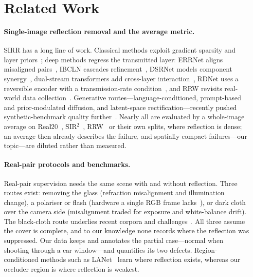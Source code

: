 \section{Related Work}
\label{sec:related}

\paragraph{Single-image reflection removal and the average metric.}
SIRR has a long line of work. Classical methods exploit gradient sparsity and layer
priors~\cite{wan2017benchmarking,wan2022crrn}; deep methods regress the transmitted
layer: ERRNet aligns misaligned pairs~\cite{wen2019errnet},
IBCLN cascades refinement~\cite{li2020ibcln}, DSRNet models component
synergy~\cite{hu2023dsrnet}, dual-stream transformers add cross-layer
interaction~\cite{hu2024dsit}, RDNet uses a reversible encoder with a transmission-rate
condition~\cite{zhao2025rdnet}, and RRW revisits real-world data
collection~\cite{zhu2024rrw}. Generative routes---language-conditioned, prompt-based and
prior-modulated diffusion, and latent-space rectification---recently pushed
synthetic-benchmark quality
further~\cite{hong2024ldiffer,promptrr2024,li2026gensirr,hu2026dai,xu2026fumo,chen2026gfrrn}.
Nearly all are evaluated by a whole-image average on Real20~\cite{zhang2018perceptual},
SIR$^2$~\cite{wan2017benchmarking}, RRW~\cite{zhu2024rrw} or their own splits, where
reflection is dense; an average then already describes the failure, and spatially
compact failures---our topic---are diluted rather than measured.

\paragraph{Real-pair protocols and benchmarks.}
Real-pair supervision needs the same scene with and without reflection.
Three routes exist: removing the glass (refraction misalignment and illumination
change), a polariser or flash (hardware a single RGB frame
lacks~\cite{lei2020polarized}), or dark cloth over the camera side (misalignment traded
for exposure and white-balance drift). The black-cloth route underlies recent corpora
and challenges~\cite{zhu2024rrw,openrr2025,cai2026ntire}. All three assume the cover is
complete, and to our knowledge none records where the reflection was suppressed. Our
data keeps and annotates the partial case---normal when shooting through a car
window---and quantifies its two defects. Region-conditioned methods such as
LANet~\cite{lanet2021} learn where reflection exists, whereas our occluder region is
where reflection is weakest.

